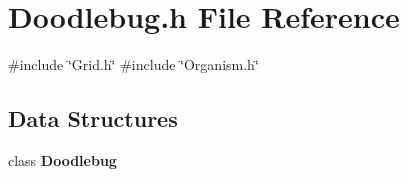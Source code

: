 \section{Doodlebug.\+h File Reference}
\label{Doodlebug_8h}
{\ttfamily \#include \char`\"{}Grid.\+h\char`\"{}}\newline
{\ttfamily \#include \char`\"{}Organism.\+h\char`\"{}}\newline
\subsection*{Data Structures}
\begin{DoxyCompactItemize}
\item 
class \textbf{ Doodlebug}
\end{DoxyCompactItemize}
